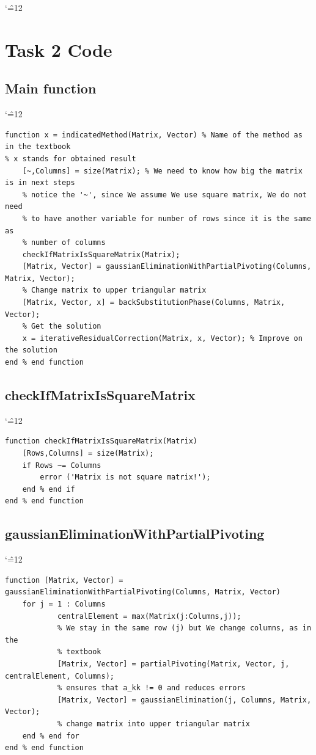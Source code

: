 \documentclass[12pt]{report}
\newenvironment{simplechar}{%
   \catcode`\^=12
}{}
\begin{document}
\begin{simplechar}
\section{Task 2 Code}

\subsection{Main function}
\begin{simplechar}
\begin{lstlisting}
function x = indicatedMethod(Matrix, Vector) % Name of the method as in the textbook
% x stands for obtained result
    [~,Columns] = size(Matrix); % We need to know how big the matrix is in next steps
    % notice the '~', since We assume We use square matrix, We do not need
    % to have another variable for number of rows since it is the same as
    % number of columns
    checkIfMatrixIsSquareMatrix(Matrix);
    [Matrix, Vector] = gaussianEliminationWithPartialPivoting(Columns, Matrix, Vector);
    % Change matrix to upper triangular matrix
    [Matrix, Vector, x] = backSubstitutionPhase(Columns, Matrix, Vector);
    % Get the solution
    x = iterativeResidualCorrection(Matrix, x, Vector); % Improve on the solution
end % end function
\end{lstlisting}
\end{simplechar}

\subsection{checkIfMatrixIsSquareMatrix}
\begin{simplechar}
\begin{lstlisting}
function checkIfMatrixIsSquareMatrix(Matrix)
    [Rows,Columns] = size(Matrix);
    if Rows ~= Columns
        error ('Matrix is not square matrix!');
    end % end if
end % end function
\end{lstlisting}
\end{simplechar}

\newpage
\subsection{gaussianEliminationWithPartialPivoting}
\begin{simplechar}
\begin{lstlisting}
function [Matrix, Vector] = gaussianEliminationWithPartialPivoting(Columns, Matrix, Vector)
    for j = 1 : Columns
            centralElement = max(Matrix(j:Columns,j));
            % We stay in the same row (j) but We change columns, as in the
            % textbook
            [Matrix, Vector] = partialPivoting(Matrix, Vector, j, centralElement, Columns);
            % ensures that a_kk != 0 and reduces errors
            [Matrix, Vector] = gaussianElimination(j, Columns, Matrix, Vector);
            % change matrix into upper triangular matrix
    end % end for
end % end function
\end{lstlisting}
\end{simplechar}


\end{simplechar}
\end{document}
